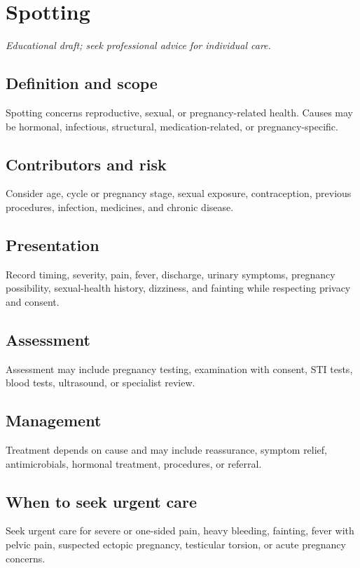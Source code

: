 \chapter{Spotting}
\medskip
\noindent\textit{Educational draft; seek professional advice for individual care.}

\section*{Definition and scope}
Spotting concerns reproductive, sexual, or pregnancy-related health. Causes may be hormonal, infectious, structural, medication-related, or pregnancy-specific.

\section*{Contributors and risk}
Consider age, cycle or pregnancy stage, sexual exposure, contraception, previous procedures, infection, medicines, and chronic disease.

\section*{Presentation}
Record timing, severity, pain, fever, discharge, urinary symptoms, pregnancy possibility, sexual-health history, dizziness, and fainting while respecting privacy and consent.

\section*{Assessment}
Assessment may include pregnancy testing, examination with consent, STI tests, blood tests, ultrasound, or specialist review.

\section*{Management}
Treatment depends on cause and may include reassurance, symptom relief, antimicrobials, hormonal treatment, procedures, or referral.

\section*{When to seek urgent care}
Seek urgent care for severe or one-sided pain, heavy bleeding, fainting, fever with pelvic pain, suspected ectopic pregnancy, testicular torsion, or acute pregnancy concerns.

